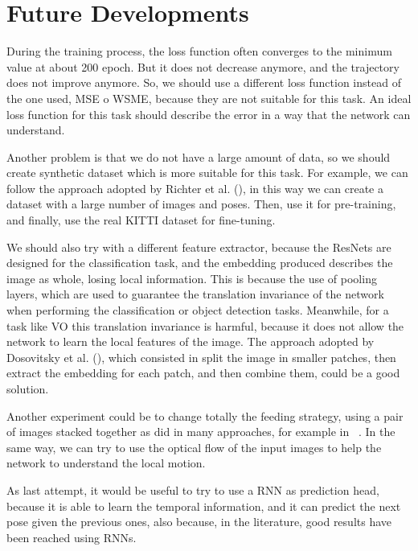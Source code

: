 \section{Future Developments}\label{sec:future-developments}

During the training process, the loss function often converges to the minimum value at about 200 epoch.
But it does not decrease anymore, and the trajectory does not improve anymore.
So, we should use a different loss function instead of the one used, MSE o WSME, because they are not suitable for this task.
An ideal loss function for this task should describe the error in a way that the network can understand.

Another problem is that we do not have a large amount of data, so we should create synthetic dataset which is more suitable for this task.
For example, we can follow the approach adopted by Richter et al. (\cite{synthetic_dataset}), in this way we can create a dataset with a large number of images and poses.
Then, use it for pre-training, and finally, use the real KITTI dataset for fine-tuning.

We should also try with a different feature extractor, because the ResNets are designed for the classification task, and the embedding produced describes the image as whole, losing local information.
This is because the use of pooling layers, which are used to guarantee the translation invariance of the network when performing the classification or object detection tasks.
Meanwhile, for a task like VO this translation invariance is harmful, because it does not allow the network to learn the local features of the image.
The approach adopted by Dosovitsky et al. (\cite{vit_paper}), which consisted in split the image in smaller patches, then extract the embedding for each patch, and then combine them, could be a good solution.

Another experiment could be to change totally the feeding strategy, using a pair of images stacked together as did in many approaches, for example in ~\cite{deep_vo}.
In the same way, we can try to use the optical flow of the input images to help the network to understand the local motion.

As last attempt, it would be useful to try to use a RNN as prediction head, because it is able to learn the temporal information, and it can predict the next pose given the previous ones, also because, in the literature, good results have been reached using RNNs.